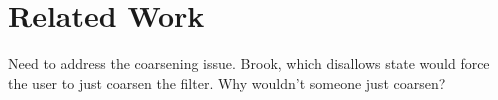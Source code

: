 \section{Related Work}


Need to address the coarsening issue.  Brook, which disallows state
would force the user to just coarsen the filter.  Why wouldn't someone
just coarsen?  
